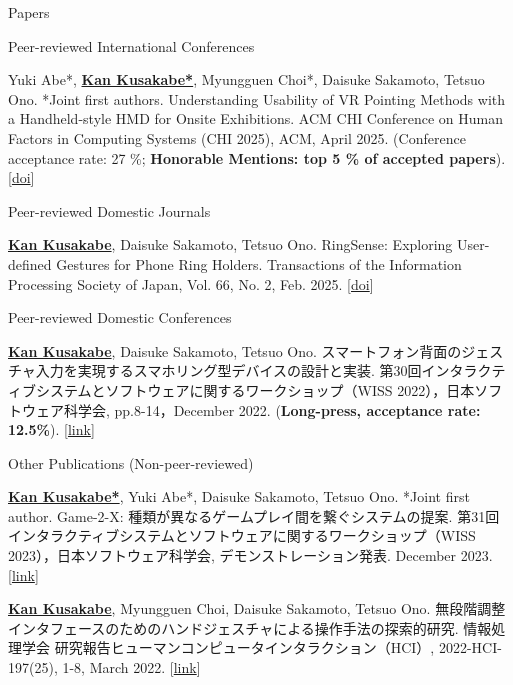 \documentclass[
	11pt, %
]{resume} %
\begin{document}
\begin{rSection}{Papers}
    
	\begin{rSubsection}{Peer-reviewed International Conferences}{}{}{}
        \item Yuki Abe*, \underline{\textbf{Kan Kusakabe*}}, Myungguen Choi*, Daisuke Sakamoto, Tetsuo Ono. *Joint first authors. Understanding Usability of VR Pointing Methods with a Handheld-style HMD for Onsite Exhibitions. ACM CHI Conference on Human Factors in Computing Systems (CHI 2025), ACM, April 2025. (Conference acceptance rate: 27 \%; \textbf{Honorable Mentions: top 5 \% of accepted papers}). [\href{https://doi.org/10.1145/3706598.3713874}{doi}]
        
    \end{rSubsection}
    \begin{rSubsection}{Peer-reviewed Domestic Journals}{}{}{}
		\item \underline{\textbf{Kan Kusakabe}}, Daisuke Sakamoto, Tetsuo Ono. RingSense: Exploring User-defined Gestures for Phone Ring Holders. Transactions of the Information Processing Society of Japan, Vol. 66, No. 2, Feb. 2025. [\href{https://doi.org/10.20729/0002000028}{doi}]
    \end{rSubsection}
    \begin{rSubsection}{Peer-reviewed Domestic Conferences}{}{}{}
		\item \underline{\textbf{Kan Kusakabe}}, Daisuke Sakamoto, Tetsuo Ono. スマートフォン背面のジェスチャ入力を実現するスマホリング型デバイスの設計と実装. 第30回インタラクティブシステムとソフトウェアに関するワークショップ（WISS 2022），日本ソフトウェア科学会, pp.8-14，December 2022. (\textbf{Long-press, acceptance rate: 12.5\%}). [\href{https://www.wiss.org/WISS2022Proceedings/data/02.pdf}{link}]
	\end{rSubsection}
    
	\begin{rSubsection}{Other Publications (Non-peer-reviewed)}{}{}{}
		\item \underline{\textbf{Kan Kusakabe*}}, Yuki Abe*, Daisuke Sakamoto, Tetsuo Ono. *Joint first author. Game-2-X: 種類が異なるゲームプレイ間を繋ぐシステムの提案. 第31回インタラクティブシステムとソフトウェアに関するワークショップ（WISS 2023），日本ソフトウェア科学会, デモンストレーション発表. December 2023. [\href{https://www.wiss.org/WISS2023Proceedings/data/1-A03.pdf}{link}]
		\item \underline{\textbf{Kan Kusakabe}}, Myungguen Choi, Daisuke Sakamoto, Tetsuo Ono. 無段階調整インタフェースのためのハンドジェスチャによる操作手法の探索的研究. 情報処理学会 研究報告ヒューマンコンピュータインタラクション（HCI）, 2022-HCI-197(25), 1-8, March 2022. [\href{http://id.nii.ac.jp/1001/00217337/}{link}]
	\end{rSubsection}


\end{rSection}
\end{document}
